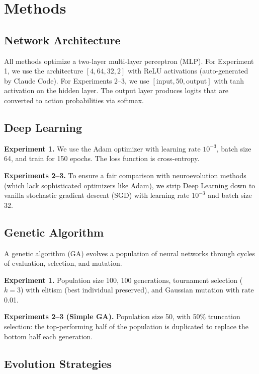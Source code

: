 \documentclass{article}
\begin{document}
\section{Methods}

\subsection{Network Architecture}

All methods optimize a two-layer multi-layer perceptron (MLP). For Experiment 1, we use the architecture $[4, 64, 32, 2]$ with ReLU activations (auto-generated by Claude Code). For Experiments 2--3, we use $[\text{input}, 50, \text{output}]$ with tanh activation on the hidden layer. The output layer produces logits that are converted to action probabilities via softmax.

\subsection{Deep Learning}

\textbf{Experiment 1.} We use the Adam optimizer \cite{kingma2014adam} with learning rate $10^{-3}$, batch size 64, and train for 150 epochs. The loss function is cross-entropy.

\textbf{Experiments 2--3.} To ensure a fair comparison with neuroevolution methods (which lack sophisticated optimizers like Adam), we strip Deep Learning down to vanilla stochastic gradient descent (SGD) with learning rate $10^{-3}$ and batch size 32.

\subsection{Genetic Algorithm}

A genetic algorithm (GA) evolves a population of neural networks through cycles of evaluation, selection, and mutation.

\textbf{Experiment 1.} Population size 100, 100 generations, tournament selection ($k=3$) with elitism (best individual preserved), and Gaussian mutation with rate 0.01.

\textbf{Experiments 2--3 (Simple GA).} Population size 50, with 50\% truncation selection: the top-performing half of the population is duplicated to replace the bottom half each generation.

\subsection{Evolution Strategies}
\end{document}

